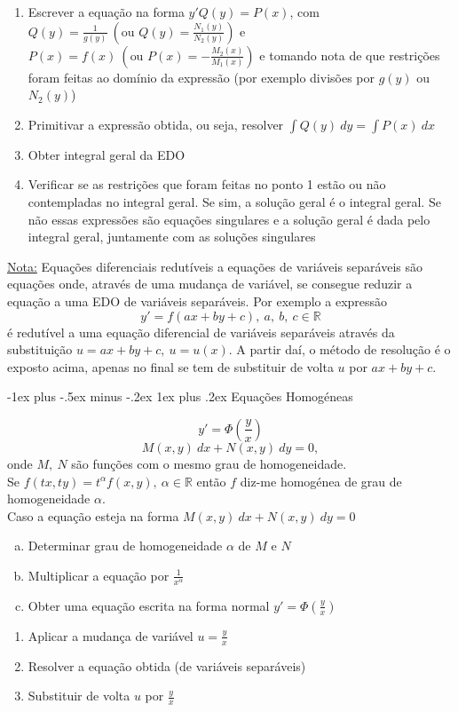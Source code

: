 \documentclass[10pt,landscape]{article}
\makeatletter
\renewcommand{\subsubsection}{\@startsection{subsubsection}{3}{0mm}%
                                {-1ex plus -.5ex minus -.2ex}%
                                {1ex plus .2ex}%
                                {\normalfont\small\bfseries}}
\makeatother
\begin{document}
\begin{multicols}{3}
\begin{enumerate}
\item Escrever a equação na forma $y'Q(y) = P(x)$, com $Q(y) = \frac{1}{g(y)}\ \left(\text{ou }Q(y) = \frac{N_1(y)}{N_2(y)}\right)$ e $P(x) = f(x)\ \left(\text{ou }P(x) = -\frac{M_2(x)}{M_1(x)}\right)$ e tomando nota de que restrições foram feitas ao domínio da expressão (por exemplo divisões por $g(y)$ ou $N_2(y)$)
\item Primitivar a expressão obtida, ou seja, resolver $\int Q(y)\ dy = \int P(x)\ dx$
\item Obter integral geral da EDO
\item Verificar se as restrições que foram feitas no ponto 1 estão ou não contempladas no integral geral. Se sim, a solução geral é o integral geral. Se não essas expressões são equações singulares e a solução geral é dada pelo integral geral, juntamente com as soluções singulares
\end{enumerate}

\underline{Nota:} Equações diferenciais redutíveis a equações de variáveis separáveis são equações onde, através de uma mudança de variável, se consegue reduzir a equação a uma EDO de variáveis separáveis. Por exemplo a expressão
$$y' = f(ax + by + c),\ a,\ b,\ c \in \mathbb{R}$$
é redutível a uma equação diferencial de variáveis separáveis através da substituição $u = ax + by + c,\ u = u(x)$. A partir daí, o método de resolução é o exposto acima, apenas no final se tem de substituir de volta $u$ por $ax + by + c$.

\subsubsection{Equações Homogéneas}

$$y' = \Phi \left(\frac{y}{x}\right)$$
$$M(x, y)\ dx + N(x, y)\ dy = 0,$$
onde $M,\ N$ são funções com o mesmo grau de homogeneidade.\\
Se $f(tx, ty) = t^\alpha f(x, y),\ \alpha \in \mathbb{R}$ então $f$ diz-me homogénea de grau de homogeneidade $\alpha$.\\[0.25cm]

Caso a equação esteja na forma $M(x, y)\ dx + N(x, y)\ dy = 0$
\begin{enumerate}[a)]
\item Determinar grau de homogeneidade $\alpha$ de $M$ e $N$
\item Multiplicar a equação por $\frac{1}{x^\alpha}$
\item Obter uma equação escrita na forma normal $y' = \Phi (\frac{y}{x})$
\end{enumerate}
\begin{enumerate}
\item Aplicar a mudança de variável $u = \frac{y}{x}$
\item Resolver a equação obtida (de variáveis separáveis)
\item Substituir de volta $u$ por $\frac{y}{x}$
\end{enumerate}


\end{multicols}
\end{document}
